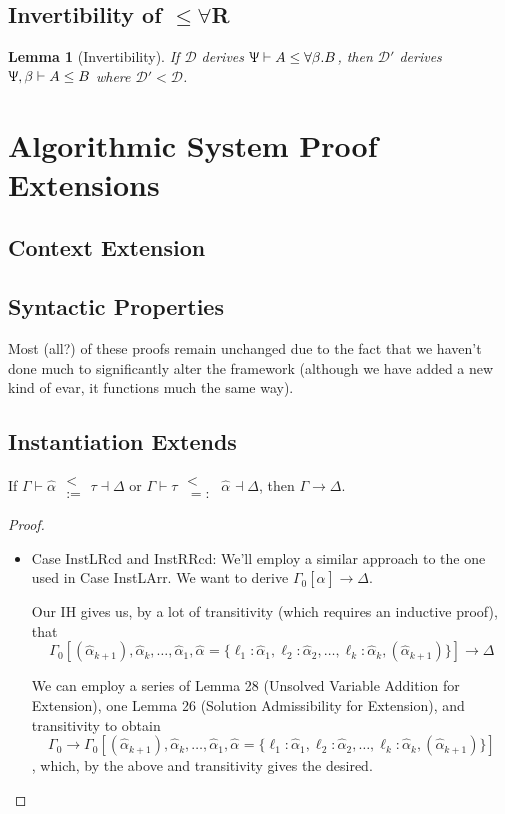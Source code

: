 \documentclass{article}
\newtheorem{lem}[thm]{Lemma}
\newenvironment{manuallemma}[1]{%
  \renewcommand\themanuallemmainner{#1}%
  \manuallemmainner
}{\endmanuallemmainner}
\newcommand{\declCtx}{\Uppsi}
\newcommand{\instLSymbol}{\;\substack{<\\:=}\;}
\newcommand{\instRSymbol}{\;\substack{<\\=:}\;}
\newcommand{\ev}{\hat}
\newcommand{\eva}[1][]{\ev \alpha_{#1}}
\newcommand{\subtypes}[3]{#1 \vdash #2 \le #3}
\newcommand{\instL}[4]{#1 \vdash #2 \instLSymbol #3 \dashv #4}
\newcommand{\instR}[4]{#1 \vdash #2 \instRSymbol #3 \dashv #4}
\newcommand{\extends}{\longrightarrow}
\begin{document}
\subsection{Invertibility of \(\le \forall\)R}
\begin{lem}[Invertibility]
  If \(\mathcal{D}\) derives \(\subtypes \declCtx A {\forall \beta. B}\), then
  \(\mathcal{D}'\) derives \(\subtypes {\declCtx, \beta} A B\) where \(\mathcal
  D ' < \mathcal D\).
\end{lem}

\section{Algorithmic System Proof Extensions}

\subsection{Context Extension}

\subsection{Syntactic Properties}

Most (all?) of these proofs remain unchanged due to the fact that we haven't
done much to significantly alter the framework (although we have added a new
kind of evar, it functions much the same way).

\subsection{Instantiation Extends}

\begin{manuallemma}{32}[Instantiation Extends]
  If \(\instL \Gamma \eva \tau \Delta\) or \(\instR \Gamma \tau \eva \Delta\),
  then \(\Gamma \extends \Delta\).
\end{manuallemma}

\begin{proof}
  \begin{itemize}
  \item Case InstLRcd and InstRRcd: We'll employ a similar approach to the one
    used in Case InstLArr. We want to derive \(\Gamma_0[\eva] \extends \Delta\).

    Our IH gives us, by a lot of transitivity (which requires an inductive
    proof), that
      \[\Gamma_0[(\eva[k+1]),\eva[k],\dots,\eva[1],\eva = \{\ell_1 : \eva[1],
        \ell_2 : \eva[2], \dots, \ell_k : \eva[k], (\eva[k+1])\}] \extends \Delta\]

      We can employ a series of Lemma 28 (Unsolved Variable Addition for
      Extension), one Lemma 26 (Solution Admissibility for Extension), and
      transitivity to obtain
    \[\Gamma_0 \extends \Gamma_0[(\eva[k+1]),\eva[k],\dots,\eva[1],\eva = \{\ell_1 : \eva[1],
      \ell_2 : \eva[2], \dots, \ell_k : \eva[k], (\eva[k+1])\}]\],
    which, by the above and transitivity gives the desired.
  \end{itemize}
\end{proof}
\end{document}

